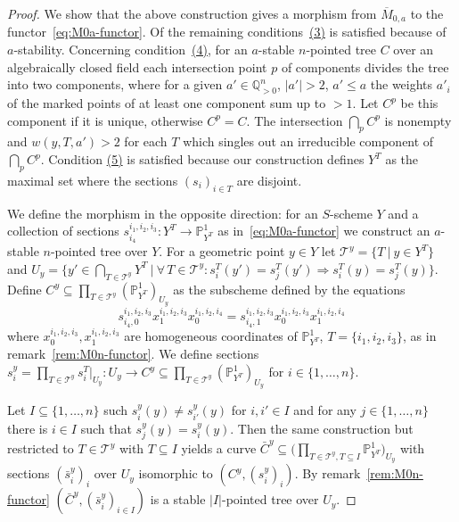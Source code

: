 \documentclass[ALCO,ThmDefs,Unicode,epreuves]{cedram}
\def\Q{\mathds Q}
\def\P{\mathds P}
\begin{document}
\begin{proof}
We show that the above construction gives a morphism from $\overline{M}_{0,a}$ to 
the functor~\eqref{eq:M0a-functor}. 
Of the remaining conditions~\hyperlink{ancretrois}{(3)} is satisfied because of $a$-stability.
Concerning condition~\hyperlink{ancrequatre}{(4)}, for an $a$-stable $n$-pointed tree $C$ over 
an algebraically closed field each intersection point $p$ of components 
divides the tree into two components, where for a given 
$a'\in\Q_{>0}^n$, $|a'|>2$, $a'\leq a$ the weights $a'_i$ of 
the marked points of at least one component sum up to $>1$. 
Let $C^p$ be this component if it is unique, otherwise $C^p=C$. 
The intersection $\bigcap_p C^p$ is nonempty and $w(y,T,a')>2$ 
for each $T$ which singles out an irreducible component of $\bigcap_p C^p$.
Condition \hyperlink{ancrecinq}{(5)} is satisfied because our construction defines $Y^T$ as 
the maximal set where the sections $(s_i)_{i\in T}$ are disjoint.

We define the morphism in the opposite direction: for an $S$-scheme $Y$ and 
a collection of sections $s^{i_1,i_2,i_3}_{i_4}\colon Y^T\to\P^1_{Y^T}$ 
as in~\eqref{eq:M0a-functor} we construct an $a$-stable $n$-pointed tree over $Y$.
For a geometric point $y\in Y$ let $\mathcal T^y=\{T\:|\:y\in Y^T\}$ and 
$U_y=\{y'\in\bigcap_{T\in\mathcal T^y}Y^T\:|\:\forall\,T\in\mathcal T^y\colon 
s^T_i(y')\!=\!s^T_j(y')\Rightarrow s^T_i(y)\!=\!s^T_j(y)\}$.
Define $C^y\subseteq\prod_{T\in\mathcal T^y}(\P^1_{Y^T})_{U_y}$ as the subscheme 
defined by the equations
 \[
s^{i_1,i_2,i_3}_{i_4,0}x^{i_1,i_2,i_3}_1x^{i_1,i_2,i_4}_0
=s^{i_1,i_2,i_3}_{i_4,1}x^{i_1,i_2,i_3}_0x^{i_1,i_2,i_4}_1
\] 
where $x^{i_1,i_2,i_3}_0,x^{i_1,i_2,i_3}_1$ are homogeneous coordinates 
of $\P^1_{Y^T}$, $T=\{i_1,i_2,i_3\}$, as in remark~\ref{rem:M0n-functor}.
We define sections 
$s^y_i=\prod_{T\in\mathcal T^y}s^T_i|_{U_y}\colon U_y\to C^y\subseteq
\prod_{T\in\mathcal T^y}(\P^1_{Y^T})_{U_y}$ for $i\in\{1,\ldots,n\}$.

Let $I\subseteq\{1,\ldots,n\}$ such $s^y_i(y)\neq s^y_{i'}(y)$ for $i,i'\in I$ 
and for any $j\in\{1,\ldots,n\}$ there is $i\in I$ such that $s^y_j(y)=s^y_i(y)$.
Then the same construction but restricted to $T\in\mathcal T^y$ with $T\subseteq I$ 
yields a curve $\bar{C}^y\subseteq\big(\prod_{T\in\mathcal T^y,T\subseteq I}
\P^1_{Y^T}\big)_{U_y}$ with sections $(\bar{s}^y_i)_i$ over $U_y$ isomorphic to 
$(C^y,(s^y_i)_i)$. By remark~\ref{rem:M0n-functor} $(\bar{C}^y,(\bar{s}^y_i)_{i\in I})$ 
is a stable $|I|$-pointed tree over $U_y$.


\end{proof}
\end{document}
